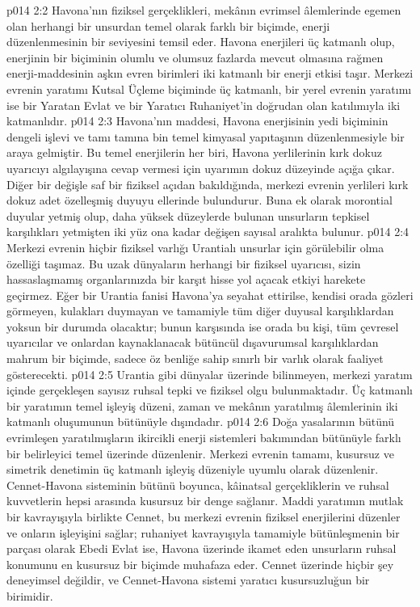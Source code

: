 \vs p014 2:2 Havona’nın fiziksel gerçeklikleri, mekânın evrimsel âlemlerinde egemen olan herhangi bir unsurdan temel olarak farklı bir biçimde, enerji düzenlenmesinin bir seviyesini temsil eder. Havona enerjileri üç katmanlı olup, enerjinin bir biçiminin olumlu ve olumsuz fazlarda mevcut olmasına rağmen enerji\hyp{}maddesinin aşkın evren birimleri iki katmanlı bir enerji etkisi taşır. Merkezi evrenin yaratımı Kutsal Üçleme biçiminde üç katmanlı, bir yerel evrenin yaratımı ise bir Yaratan Evlat ve bir Yaratıcı Ruhaniyet’in doğrudan olan katılımıyla iki katmanlıdır.
\vs p014 2:3 Havona’nın maddesi, Havona enerjisinin yedi biçiminin dengeli işlevi ve tamı tamına bin temel kimyasal yapıtaşının düzenlenmesiyle bir araya gelmiştir. Bu temel enerjilerin her biri, Havona yerlilerinin kırk dokuz uyarıcıyı algılayışına cevap vermesi için uyarımın dokuz düzeyinde açığa çıkar. Diğer bir değişle saf bir fiziksel açıdan bakıldığında, merkezi evrenin yerlileri kırk dokuz adet özelleşmiş duyuyu ellerinde bulundurur. Buna ek olarak morontial duyular yetmiş olup, daha yüksek düzeylerde bulunan unsurların tepkisel karşılıkları yetmişten iki yüz ona kadar değişen sayısal aralıkta bulunur.
\vs p014 2:4 Merkezi evrenin hiçbir fiziksel varlığı Urantialı unsurlar için görülebilir olma özelliği taşımaz. Bu uzak dünyaların herhangi bir fiziksel uyarıcısı, sizin hassaslaşmamış organlarınızda bir karşıt hisse yol açacak etkiyi harekete geçirmez. Eğer bir Urantia fanisi Havona’ya seyahat ettirilse, kendisi orada gözleri görmeyen, kulakları duymayan ve tamamiyle tüm diğer duyusal karşılıklardan yoksun bir durumda olacaktır; bunun karşısında ise orada bu kişi, tüm çevresel uyarıcılar ve onlardan kaynaklanacak bütüncül dışavurumsal karşılıklardan mahrum bir biçimde, sadece öz benliğe sahip sınırlı bir varlık olarak faaliyet gösterecekti.
\vs p014 2:5 Urantia gibi dünyalar üzerinde bilinmeyen, merkezi yaratım içinde gerçekleşen sayısız ruhsal tepki ve fiziksel olgu bulunmaktadır. Üç katmanlı bir yaratımın temel işleyiş düzeni, zaman ve mekânın yaratılmış âlemlerinin iki katmanlı oluşumunun bütünüyle dışındadır.
\vs p014 2:6 Doğa yasalarının bütünü evrimleşen yaratılmışların ikircikli enerji sistemleri bakımından bütünüyle farklı bir belirleyici temel üzerinde düzenlenir. Merkezi evrenin tamamı, kusursuz ve simetrik denetimin üç katmanlı işleyiş düzeniyle uyumlu olarak düzenlenir. Cennet\hyp{}Havona sisteminin bütünü boyunca, kâinatsal gerçekliklerin ve ruhsal kuvvetlerin hepsi arasında kusursuz bir denge sağlanır. Maddi yaratımın mutlak bir kavrayışıyla birlikte Cennet, bu merkezi evrenin fiziksel enerjilerini düzenler ve onların işleyişini sağlar; ruhaniyet kavrayışıyla tamamiyle bütünleşmenin bir parçası olarak Ebedi Evlat ise, Havona üzerinde ikamet eden unsurların ruhsal konumunu en kusursuz bir biçimde muhafaza eder. Cennet üzerinde hiçbir şey deneyimsel değildir, ve Cennet\hyp{}Havona sistemi yaratıcı kusursuzluğun bir birimidir.
